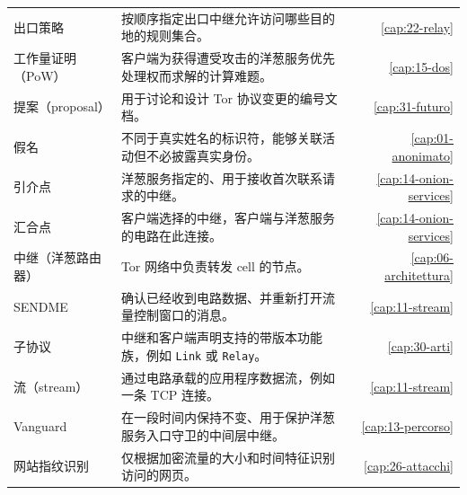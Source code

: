 {\begin{longtable}{@{}>{\raggedright\arraybackslash}p{4.1cm}>{\raggedright\arraybackslash}p{8.0cm}r@{}}
出口策略 & 按顺序指定出口中继允许访问哪些目的地的规则集合。 & \ref{cap:22-relay} \\
工作量证明（PoW） & 客户端为获得遭受攻击的洋葱服务优先处理权而求解的计算难题。 & \ref{cap:15-dos} \\
提案（proposal） & 用于讨论和设计 Tor 协议变更的编号文档。 & \ref{cap:31-futuro} \\
假名 & 不同于真实姓名的标识符，能够关联活动但不必披露真实身份。 & \ref{cap:01-anonimato} \\
引介点 & 洋葱服务指定的、用于接收首次联系请求的中继。 & \ref{cap:14-onion-services} \\
汇合点 & 客户端选择的中继，客户端与洋葱服务的电路在此连接。 & \ref{cap:14-onion-services} \\
中继（洋葱路由器） & Tor 网络中负责转发 cell 的节点。 & \ref{cap:06-architettura} \\
SENDME & 确认已经收到电路数据、并重新打开流量控制窗口的消息。 & \ref{cap:11-stream} \\
子协议 & 中继和客户端声明支持的带版本功能族，例如 \texttt{Link} 或 \texttt{Relay}。 & \ref{cap:30-arti} \\
流（stream） & 通过电路承载的应用程序数据流，例如一条 TCP 连接。 & \ref{cap:11-stream} \\
Vanguard & 在一段时间内保持不变、用于保护洋葱服务入口守卫的中间层中继。 & \ref{cap:13-percorso} \\
网站指纹识别 & 仅根据加密流量的大小和时间特征识别访问的网页。 & \ref{cap:26-attacchi} \\
\end{longtable}
}
